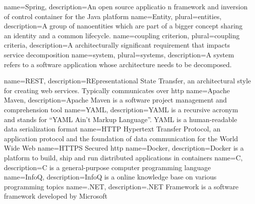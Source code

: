 {
  name={Spring},
  description={An open source applicatio	n framework and inversion of control container for the Java platform}
}
{
	name={Entity},
	plural={entities},
	description={A group of nanoentities which are part of a bigger concept sharing an identity and a common lifecycle.\cite{evans2003domain}}
}
{
	name={coupling criterion},
	plural={coupling criteria},
	description={A architecturally significant requirement that impacts service decomposition}
}
{
	name={system},
	plural={systems},
	description={A system refers to a software application whose architecture needs to be decomposed.}
}

{
  name={REST},
  description={REpresentational State Transfer, an architectural style for creating web services. Typically communicates over \gls{http}}
}
{
  name={Apache Maven},
  description={Apache Maven is a software project management and comprehension tool}
}
{
  name={YAML},
  description={YAML is a recursive acronym and stands for \enquote{YAML Ain't Markup Language}. YAML is a human-readable data serialization format}
}
{
  name={HTTP}
}
{
	Hypertext Transfer Protocol, an application protocol and the foundation of data communication for the World Wide Web \cite{http_wikipedia}
}
{
  name={HTTPS}
}
{
	Secured \gls{http}
}
{
  name={Docker},
  description={Docker is a platform to build, ship and run distributed applications in containers}
}
{
  name={C},
  description={C is a general-purpose computer programming language}
}
{
  name={InfoQ},
  description={InfoQ is a online knowledge base on various programming topics}
}
{
  name={.NET},
  description={.NET Framework is a software framework developed by Microsoft}
}

